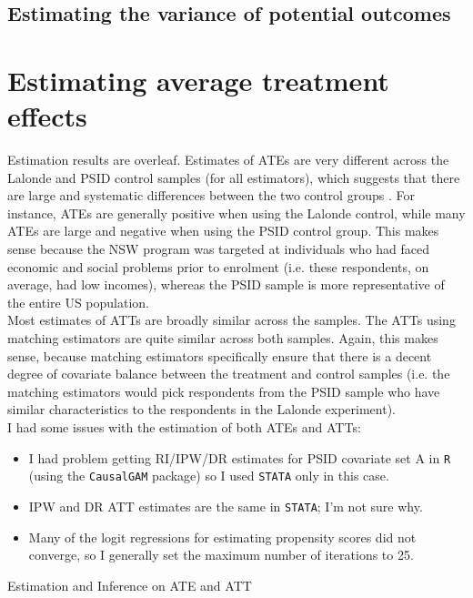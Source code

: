 \documentclass[12pt]{article}
\begin{document}
\subsection{Estimating the variance of potential outcomes}


\newpage
\section{Estimating average treatment effects}

Estimation results are overleaf. Estimates of ATEs are very different across the Lalonde and PSID control samples (for all estimators), which suggests that there are large and systematic differences between the two control groups . For instance, ATEs are generally positive when using the Lalonde control, while many ATEs are large and negative when using the PSID control group. This makes sense because the NSW program was targeted at individuals who had faced economic and social problems prior to enrolment (i.e. these respondents, on average, had low incomes), whereas the PSID sample is more representative of the entire US population. \\

Most estimates of ATTs are broadly similar across the samples. The ATTs using matching estimators are quite similar across both samples. Again, this makes sense, because matching estimators specifically ensure that there is a decent degree of covariate balance between the treatment and control samples (i.e. the matching estimators would pick respondents from the PSID sample who have similar characteristics to the respondents in the Lalonde experiment).\\

I had some issues with the estimation of both ATEs and ATTs:
\begin{itemize}
\item I had problem getting RI/IPW/DR estimates for PSID covariate set A in \verb|R| (using the \verb|CausalGAM| package) so I used \verb|STATA| only in this case.
\item IPW and DR ATT estimates are the same in \verb|STATA|; I'm not sure why.
\item Many of the logit regressions for estimating propensity scores did not converge, so I generally set the maximum number of iterations to 25.
\end{itemize}



\begin{landscape}
\begin{table}
\centering
\caption{Estimation and Inference on ATE and ATT}\label{tab:tableQ2}
\vspace{-.1in}\resizebox{\columnwidth}{!}{
\subfloat[][ATE]{}\quad
\subfloat[][ATT]{}
}
\end{table}
\end{landscape}

\newpage
\end{document}

